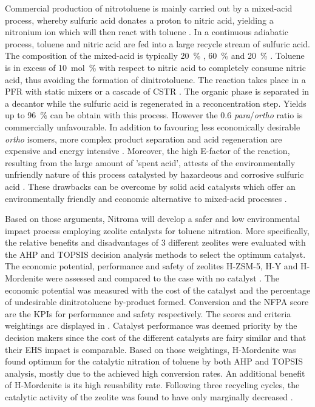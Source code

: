 Commercial production of nitrotoluene is mainly carried out by a mixed-acid process, whereby sulfuric acid donates a proton to nitric acid, yielding a nitronium ion which will then react with toluene \cite{halder_nitration_2007}. In a continuous adiabatic process, toluene and nitric acid are fed into a large recycle stream of sulfuric acid. The composition of the mixed-acid is typically \SI{20}{\percent} , \SI{60}{\percent}  and \SI{20}{\percent}  \cite{pande_nitration_2010}. Toluene is in excess of \SI{10}{mol\percent} with respect to nitric acid to completely consume nitric acid, thus avoiding the formation of dinitrotoluene. The reaction takes place in a PFR with static mixers or a cascade of CSTR \cite{dugal_nitrobenzene_2005}. The organic phase is separated in a decantor while the sulfuric acid is regenerated in a reconcentration step. Yields up to \SI{96}{\percent} can be obtain with this process. However the 0.6 \textit{para}/\textit{ortho} ratio is commercially unfavourable. In addition to favouring less economically desirable \textit{ortho} isomers, more complex product separation and acid regeneration are expensive and energy intensive \cite{sreedhar_scientific_2013}. Moreover, the high E-factor of the reaction, resulting from the large amount of 'spent acid', attests of the environmentally unfriendly nature of this process catalysted by hazardeous and corrosive sulfuric acid \cite{pande_nitration_2010}. These drawbacks can be overcome by solid acid catalysts which offer an environmentally friendly and economic alternative to mixed-acid processes \cite{vassena_selective_1999}.

 Based on those arguments, Nitroma will develop a safer and low environmental impact process employing zeolite catalysts for toluene nitration. More specifically, the relative benefits and disadvantages of 3 different zeolites were evaluated with the AHP and TOPSIS decision analysis methods to select the optimum catalyst. The economic potential, performance and safety of zeolites H-ZSM-5, H-Y and H-Mordenite were assessed and compared to the case with no catalyst \cite{jeeru_kinetics_2018}.  The economic potential was measured with the cost of the catalyst and the percentage of undesirable dinitrotoluene by-product formed. Conversion and the NFPA score are the KPIs for performance and safety respectively. The scores and criteria weightings are displayed in . Catalyst performance was deemed priority by the decision makers since the cost of the different catalysts are fairy similar and that their EHS impact is comparable. Based on those weightings, H-Mordenite was found optimum for the catalytic nitration of toluene by both AHP and TOPSIS analysis, mostly due to the achieved high conversion rates. An additional benefit of H-Mordenite is its high reusability rate. Following three recycling cycles, the catalytic activity of the zeolite was found to have only marginally decreased \cite{jeeru_kinetics_2018}. 


